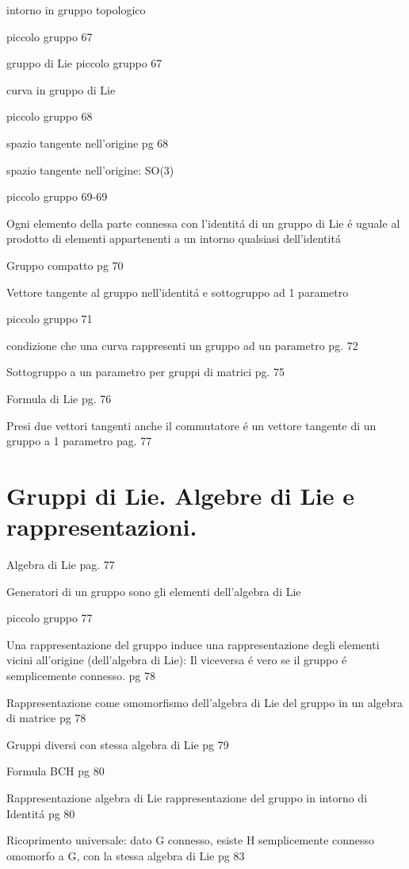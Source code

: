 \documentclass[oneside,12pt]{memoir}
\begin{document}
\begin{itemize*}
\item intorno in gruppo topologico 
\item piccolo gruppo 67
\item gruppo di Lie piccolo gruppo 67
\item curva in gruppo di Lie 
\item piccolo gruppo 68
\item spazio tangente nell'origine pg 68
\item spazio tangente nell'origine: SO(3)
\item piccolo gruppo 69-69
\item Ogni elemento della parte connessa con l'identit\'a di un gruppo di Lie \'e uguale al prodotto di elementi appartenenti a un intorno qualsiasi dell'identit\'a
\item Gruppo compatto pg 70
\item Vettore tangente al gruppo nell'identit\'a e sottogruppo ad 1 parametro 
\item piccolo gruppo 71
\item condizione che una curva rappresenti un gruppo ad un parametro pg. 72
\item Sottogruppo a un parametro per gruppi di matrici pg.  75
\item Formula di Lie pg. 76
\item Presi due vettori tangenti anche il commutatore \'e un vettore tangente di un gruppo a 1 parametro pag. 77
\end{itemize*}


\section{Gruppi di Lie. Algebre di Lie e rappresentazioni.}

\begin{itemize*}
\item Algebra di Lie pag. 77
\item Generatori di un gruppo sono gli elementi dell'algebra di Lie 
\item piccolo gruppo 77
\item Una rappresentazione del gruppo induce una rappresentazione degli elementi vicini all'origine (dell'algebra di Lie): Il viceversa \'e vero se il gruppo \'e semplicemente connesso. pg  78
\item Rappresentazione come omomorfismo dell'algebra di Lie del gruppo in un algebra di matrice pg 78
\item Gruppi diversi con stessa algebra di Lie pg 79
\item Formula BCH pg 80
\item Rappresentazione algebra di Lie rappresentazione del gruppo in intorno di Identit\'a pg 80
\item Ricoprimento universale: dato G connesso, esiste H semplicemente connesso omomorfo a G, con la stessa algebra di Lie pg 83
\end{itemize*}
\end{document}
